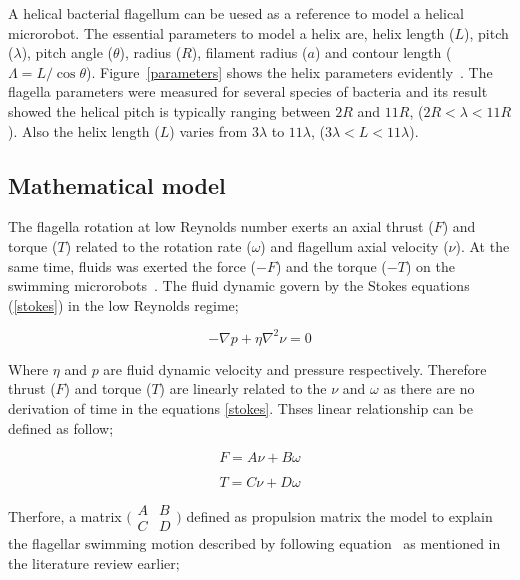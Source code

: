 \documentclass[12pt,a4paper,titlepage]{report}
\begin{document}
A helical bacterial flagellum can be uesed as a reference to model a helical microrobot. The 
essential parameters to model a helix are, helix length ($L$), pitch ($\lambda$), pitch angle ($\theta$), 
radius ($R$), filament radius ($a$) and contour length ($\Lambda = L/ \cos \theta$). Figure~\ref{parameters} shows
the helix parameters evidently~\citep{rodenborn2013propulsion}. The flagella parameters were measured for
 several species of bacteria and its result showed the helical pitch is typically ranging between $2R$ and
$11R$, ($2R < \lambda < 11R$). Also the helix length ($L$) varies from $3\lambda$ to $11\lambda$, 
($3\lambda < L < 11\lambda$).


\subsection{Mathematical model}
The flagella rotation at low Reynolds number exerts an axial thrust ($F$) and torque ($T$) related to the
rotation rate ($\omega$) and flagellum axial velocity ($\nu$). At the same time, fluids was exerted the force
 ($-F$) and the torque ($-T$) on the swimming microrobots~\citep{purcell1997efficiency}. The fluid dynamic 
govern by the Stokes equations (\ref{stokes}) in the low Reynolds regime;


\begin{equation}
  -\nabla{p}+ \eta\nabla^2{\nu}  = 0
\label{stokes}
\end{equation}

Where $\eta$ and $p$ are fluid dynamic velocity and pressure respectively. Therefore thrust ($F$) and 
torque ($T$) are linearly related to the $\nu$ and $\omega$ as there are no derivation of time in 
the equations \ref{stokes}. Thses linear relationship can be defined as follow;


\begin{equation}
  F  = A\nu + B\omega
\label{linear1}
\end{equation}

\begin{equation}
  T = C\nu + D\omega
\label{linear2}
\end{equation}


 Therfore, a matrix 
$\bigl(\begin{smallmatrix}
A&B\\ C&D
\end{smallmatrix} \bigr)$
 defined as propulsion matrix the
model to explain the flagellar swimming motion described by following equation~\citep{rodenborn2013propulsion}
as mentioned in the literature review earlier;
 
\end{document}
